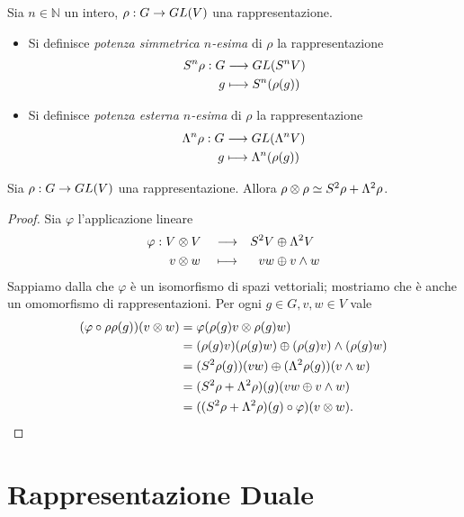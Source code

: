 \begin{definition}
Sia $n\in\mathbb{N}$ un intero, $\rho:G\to GL(V)$ una rappresentazione.
\begin{itemize}
\item Si definisce \emph{potenza simmetrica $n$-esima} di $\rho$ la rappresentazione
\begin{align*}
S^n\rho:G&\longrightarrow GL(S^nV)\\
g&\longmapsto S^n(\rho(g))
\end{align*}
\item Si definisce \emph{potenza esterna $n$-esima} di $\rho$ la rappresentazione
\begin{align*}
\Lambda^n\rho:G&\longrightarrow GL(\Lambda^nV)\\
g&\longmapsto\Lambda^n(\rho(g))
\end{align*}
\end{itemize}
\end{definition}

\begin{proposition}
Sia $\rho:G\to GL(V)$ una rappresentazione. Allora $\rho\otimes\rho\simeq S^2\rho+\Lambda^2\rho$.
\end{proposition}
\begin{proof}
Sia $\varphi$ l'applicazione lineare
\begin{alignat*}{3}
\varphi:V&\otimes V&&\longrightarrow&S^2V&\oplus\Lambda^2V\\
v&\otimes w&&\longmapsto& vw&\oplus v\wedge w
\end{alignat*}
Sappiamo dalla  che $\varphi$ è un isomorfismo di spazi vettoriali; mostriamo che è anche un omomorfismo di rappresentazioni. Per ogni $g\in G\comma v, w\in V$ vale
\begin{align*}
(\varphi\circ\rho\rho(g))(v\otimes w)&=\varphi(\rho(g)v\otimes\rho(g)w)\\
&=(\rho(g)v)(\rho(g)w)\oplus(\rho(g)v)\wedge(\rho(g)w)\\
&=(S^2\rho(g))(vw)\oplus(\Lambda^2\rho(g))(v\wedge w)\\
&=(S^2\rho+\Lambda^2\rho)(g)(vw\oplus v\wedge w)\\
&=((S^2\rho+\Lambda^2\rho)(g)\circ\varphi)(v\otimes w).
\end{align*}
\end{proof}


\section{Rappresentazione Duale}

